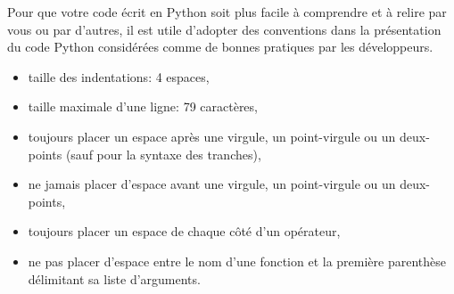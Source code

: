 Pour que votre code écrit en Python soit plus facile à comprendre et à relire par vous ou par d'autres, il est utile d'adopter des conventions dans la présentation du code Python considérées comme de bonnes pratiques par les développeurs. 

\begin{itemize}
  \item taille des indentations: 4 espaces,
  \item  taille maximale d'une ligne: 79 caractères,
  \item toujours placer un espace après une virgule, un point-virgule ou un deux-points (sauf pour la syntaxe des tranches),
  \item ne jamais placer d'espace avant une virgule, un point-virgule ou un deux-points,
  \item toujours placer un espace de chaque côté d'un opérateur,
  \item ne pas placer d'espace entre le nom d'une fonction et la première parenthèse délimitant sa liste d'arguments.
\end{itemize}
